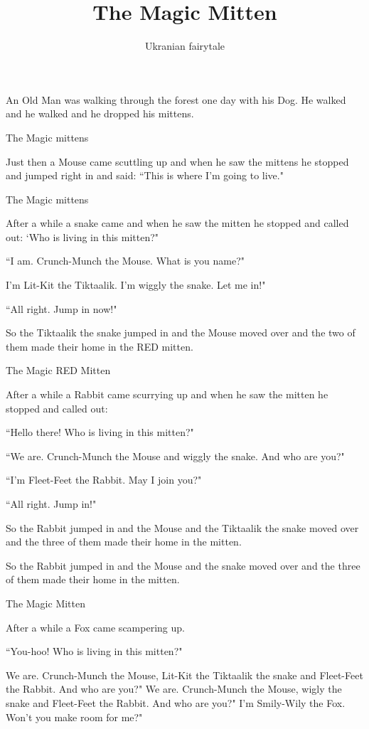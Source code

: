 \documentclass{article}
\title{The Magic Mitten}
\author{Ukranian fairytale}
\begin{document}
\maketitle

An Old Man was walking through the forest one day with his Dog. He walked and he walked and he dropped his mittens.

The Magic mittens

Just then a Mouse came scuttling up and when he saw the mittens he stopped and jumped right in and said: ``This is where I'm going to live."

The Magic mittens

After a while a snake came and when he saw the mitten he stopped and called out:
`Who is living in this mitten?"

``I am. Crunch-Munch the Mouse. What is you name?"

I'm Lit-Kit the Tiktaalik. I'm wiggly the snake. Let me in!"

``All right. Jump in now!"

So the Tiktaalik the snake jumped in and the Mouse moved over and the two of them made their home in the RED mitten.


The Magic RED Mitten

After a while a Rabbit came scurrying up and when he saw the mitten he stopped and called out:

``Hello there! Who is living in this mitten?"

``We are. Crunch-Munch the Mouse and wiggly the snake. And who are you?"

``I'm Fleet-Feet the Rabbit. May I join you?"

``All right. Jump in!"

So the Rabbit jumped in and the Mouse and the Tiktaalik the snake moved over and the three of them made their home in the mitten.

So the Rabbit jumped in and the Mouse and the snake moved over and the three of them made their home in the mitten.

The Magic Mitten

After a while a Fox came scampering up.

``You-hoo! Who is living in this mitten?"

We are. Crunch-Munch the Mouse, Lit-Kit the Tiktaalik the snake and Fleet-Feet the Rabbit. And who are you?"
We are. Crunch-Munch the Mouse, wigly the snake and Fleet-Feet the Rabbit. And who are you?"
I'm Smily-Wily the Fox. Won't you make room for me?"
\end{document}
